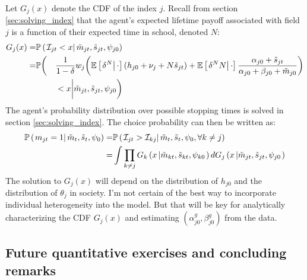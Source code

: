 \documentclass[11 pt]{article}
\newcommand{\pr}[1]{\left( #1 \right)}
\newcommand{\ce}[2]{\left[\left. #1 \right\vert #2 \right]}
\newcommand{\cls}[2]{\left. #1 \right\vert #2}
\newcommand{\crs}[2]{#1 \left\vert #2 \right.}
\newcommand{\study}{m} %
\newcommand{\pass}{s}
\newcommand{\pstates}{\tilde{\study}_{jt}, \tilde{\pass}_{jt}, \psi_{j0}}
\newcommand*{\ks}[1][t]{\tilde{\pass}_{j #1}}
\begin{document}
Let $G_j (x)$ denote the CDF of the index $j$. Recall from section \ref{sec:solving_index} that the agent's expected lifetime payoff associated with field $j$ is a function of their expected time in school, denoted $N$:
\begin{alignat*}{3}
    G_j(x) =& \PP \pr{\cls{\mathcal{I}_{jt} < x}{\pstates}} \span \span
    \\
    =&
    \PP \bigg(
        &&\frac{1}{1 - \delta} w_j
        \bigg(
            \EE \ce{\delta^N}{\cdot} 
            \pr{h_{j0} + \nu_j + N \ks}
            + 
            \EE \ce{\delta^N N}{\cdot} 
            \frac{\alpha_{j0} + \ks}{\alpha_{j0} + \beta_{j0} + \tilde{\study}_{j0}}
        \bigg) \\
    &&&< x \bigg\vert \pstates \bigg)
\end{alignat*}
The agent's probability distribution over possible stopping times is solved in section \ref{sec:solving_index}.
The choice probability can then be written as:
\begin{align*}
    \PP \pr{\cls{
        m_{jt} = 1
    }{\tilde{\study}_t, \tilde{\pass}_t, \psi_0}}
    =& 
    \PP \pr{\cls{
        \mathcal{I}_{jt} > \mathcal{I}_{kj}
    }{\tilde{\study}_t, \tilde{\pass}_t, \psi_0, \forall k \neq j}}
    \\
    =& 
    \int \prod_{k \neq j} 
    G_k \pr{
        \crs{x}{\tilde{\study}_{kt}, \tilde{\pass}_{kt}, \psi_{k0}}
    } d G_j \pr{
        \crs{x}{\tilde{\study}_{jt}, \tilde{\pass}_{jt}, \psi_{j0}}
    }
\end{align*}
The solution to $G_j(x)$ will depend on the distribution of $h_{j0}$ and the distribution of $\theta_j$ in society.
I'm not certain of the best way to incorporate individual heterogeneity into the model. 
But that will be key for analytically characterizing the CDF $G_j (x)$ and estimating $(\alpha_{j0}^g, \beta_{j0}^g)$ from the data.  


\subsection{Future quantitative exercises and concluding remarks}\label{sec:extensions}
\end{document}
